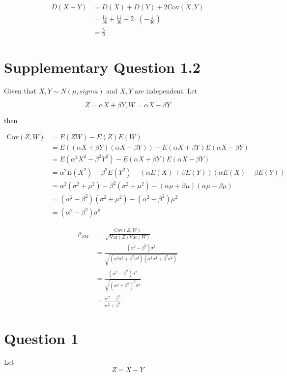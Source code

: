 \documentclass[a4paper, UTF-8]{article}
\theoremstyle{plain}
\begin{document}
\begin{align*}
D(X + Y) &= D(X) + D(Y) + 2\text{Cov}(X, Y) \\ 
&= \frac{11}{36} + \frac{11}{36} + 2\cdot\left(-\frac{1}{36}\right)\\ &= \frac{5}{9}
\end{align*}

\section{Supplementary Question 1.2}

Given that $X, Y \sim N(\mu, sigma)$ and $X, Y$ are independent. Let

$$
Z = \alpha X + \beta Y, W = \alpha X - \beta Y
$$

then 

\begin{align*}
\text{Cov}(Z, W) &= E(ZW) - E(Z)E(W) \\ 
&= E((\alpha X + \beta Y)(\alpha X - \beta Y)) - E(\alpha X + \beta Y)E(\alpha X - \beta Y) \\ 
&= E(\alpha^2 X^2 - \beta^2 Y^2) - E(\alpha X + \beta Y)E(\alpha X - \beta Y) \\
&= \alpha^2 E(X^2) - \beta^2 E(Y^2) - (\alpha E(X) + \beta E(Y))(\alpha E(X) - \beta E(Y)) \\
&= \alpha^2 (\sigma^2 + \mu^2) - \beta^2 (\sigma^2 + \mu^2) - (\alpha \mu + \beta \mu)(\alpha \mu - \beta \mu) \\
&= (\alpha^2 - \beta^2)(\sigma^2 + \mu^2) - (\alpha^2 - \beta^2)\mu^2 \\
&= (\alpha^2 - \beta^2)\sigma^2
\end{align*}

\begin{align*} 
\rho_{ZW} &= \frac{\text{Cov}(Z, W)}{\sqrt{\text{Var}(Z)\text{Var}(W)}} \\
&= \frac{(\alpha^2 - \beta^2)\sigma^2}{\sqrt{(\alpha^2 \sigma^2 + \beta^2 \sigma^2)(\alpha^2 \sigma^2 + \beta^2 \sigma^2)}} \\
&= \frac{(\alpha^2 - \beta^2)\sigma^2}{\sqrt{(\alpha^2 + \beta^2)^2 \sigma^4}} \\
&= \frac{\alpha^2 - \beta^2}{\alpha^2 + \beta^2}
\end{align*}

\section{Question 1} 

Let 
$$
Z = X - Y
$$
\end{document}
